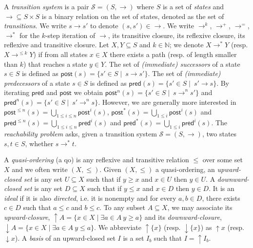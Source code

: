 \documentclass[runningheads]{llncs}
\newcommand{\pred}{\textsf{pred}}
\newcommand{\post}{\textsf{post}}
\begin{document}
\noindent
 A {\em transition system} is a pair $\mathscr{S} = (S,\rightarrow )$ where $S$ is a set of 
 {\em states} and  
 $ {\rightarrow} \subseteq S \times S$ is a
 binary relation 
 on
 the set of states, denoted as the set of {\em transitions}. 
%
We write $s \rightarrow s'$ to denote $ (s,s') \in  {\rightarrow} $.
We write $\rightarrow^{k}$, $\rightarrow^{+}$, $\rightarrow^{=}$, $\rightarrow^{*}$
for the $k$-step iteration of $\rightarrow$, its transitive closure, its reflexive closure, its reflexive and transitive closure.
Let $X,Y \subseteq S$ and $k \in \mathbb{N}$; we denote $X \longrightarrow^{*} Y$ (resp. $X \longrightarrow^{\leq k} Y$) if from all states $x \in X$ there exists a path (resp. of length smaller than $k$) that reaches a state $y \in Y$.
\noindent
The set of {\em (immediate) successors} of a state $s \in S$ is defined as 
 $\post(s) = \{ s' \in S \mid  ~ s \xrightarrow{} s'\}$. 
The set of {\em (immediate) predecessors} of a state $s \in S$ is deﬁned as
 $\pred(s) = \{ s' \in S \mid  ~ s' \xrightarrow{} s\}$. 
By iterating $\pred$ and $\post$ we obtain  
$\post^n(s) = \{ s' \in S \mid  ~ s \xrightarrow{}^n s'\}$
and
$\pred^n(s) = \{ s' \in S \mid  ~ s' \xrightarrow{}^n s\}$.
However, we are generally more interested in
$\post^{\leq n}(s) = \bigcup_{1 \leq i \leq n} \post^i(s)$, $\post^*(s)= \bigcup_{1 \leq i} \post^i(s)$
and
$\pred^{\leq n}(s) = \bigcup_{1 \leq i \leq n} \pred^i(s)$ and $\pred^*(s) = \bigcup_{1 \leq i} \pred^i(s)$. 
The {\em reachability problem} asks, given a transition system $\mathscr{S} = (S, \to)$, two states $s, t \in S$, whether $s \to^* t$. 

%


A {\em quasi-ordering} (a qo) is any reflexive and transitive relation $\leq$ over some set $X$ and we often write $(X,\leq)$. 
Given $(X,\leq)$ a quasi-ordering, an {\em upward-closed set} is any set $U \subseteq X$ such that if $y \geq x$ and $x \in U$ then $y \in U $.
A {\em downward-closed set} is any set $D \subseteq X$ such that if $y \leq x$ and $x \in D$ then $y \in D $. 
It is an {\em ideal } if it is also {\em directed}, i.e. it is nonempty and for every $a,b \in D$, there exists $c \in D$ such that $a \leq c$ and $b \leq c$.
To any subset $A \subseteq X$, we may associate
its {\em upward-closure},
 $\uparrow A = \{x \in X \mid \exists a \in A ~ y \geq a\}$
 and its 
 {\em downward-closure},
 $\downarrow A = \{x \in X \mid \exists a \in A ~ y \leq a\}$. 
We abbreviate $\uparrow \{x\}$ (resp. $\downarrow \{x\}$)
as $\uparrow x$ (resp. $\downarrow x$).
%
A {\em basis} of an upward-closed set $I$ is a set $I_b$ such that $I = \uparrow I_b$. 
\end{document}

